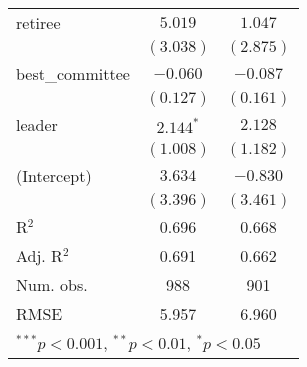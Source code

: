 \documentclass[12pt]{article}
\begin{document}
\begin{table}
\begin{center}
\begin{tabular}{l c c }
retiree                  & $5.019$        & $1.047$        \\
& $(3.038)$      & $(2.875)$      \\
best\_committee          & $-0.060$       & $-0.087$       \\
& $(0.127)$      & $(0.161)$      \\
leader                   & $2.144^{*}$    & $2.128$        \\
& $(1.008)$      & $(1.182)$      \\
(Intercept)              & $3.634$        & $-0.830$       \\
& $(3.396)$      & $(3.461)$      \\
\hline
R$^2$                    & 0.696          & 0.668          \\
Adj. R$^2$               & 0.691          & 0.662          \\
Num. obs.                & 988            & 901            \\
RMSE                     & 5.957          & 6.960          \\
			\hline
			\multicolumn{3}{l}{\scriptsize{$^{***}p<0.001$, $^{**}p<0.01$, $^*p<0.05$}}
		\end{tabular}
	\end{center}
\end{table}
\end{document}
